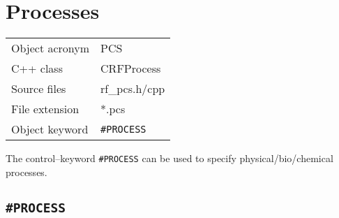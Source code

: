 \section{Processes}
\label{sec:pcs}

\begin{tabular*}{5.35cm}{|p{2.5cm}|p{2cm}|} \hline
Object acronym & PCS \\
C++ class  & CRFProcess \\
Source files   & rf\_pcs.h/cpp \\
\hline
File extension & *.pcs \\
Object keyword &  {\texttt{\#PROCESS}} \\
\hline
\end{tabular*}

\bigskip
The control--keyword {\texttt{\#PROCESS}} can be used to specify
physical/bio/chemical processes.

\subsection{\bf\texttt{\#PROCESS}}

